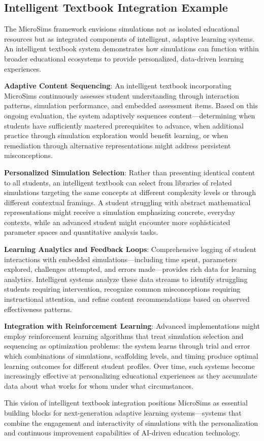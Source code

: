 \subsection{Intelligent Textbook Integration Example}

The MicroSims framework envisions simulations not as isolated educational resources but as integrated components of intelligent, adaptive learning systems. An intelligent textbook system demonstrates how simulations can function within broader educational ecosystems to provide personalized, data-driven learning experiences.

\textbf{Adaptive Content Sequencing}: An intelligent textbook incorporating MicroSims continuously assesses student understanding through interaction patterns, simulation performance, and embedded assessment items. Based on this ongoing evaluation, the system adaptively sequences content—determining when students have sufficiently mastered prerequisites to advance, when additional practice through simulation exploration would benefit learning, or when remediation through alternative representations might address persistent misconceptions.

\textbf{Personalized Simulation Selection}: Rather than presenting identical content to all students, an intelligent textbook can select from libraries of related simulations targeting the same concepts at different complexity levels or through different contextual framings. A student struggling with abstract mathematical representations might receive a simulation emphasizing concrete, everyday contexts, while an advanced student might encounter more sophisticated parameter spaces and quantitative analysis tasks.

\textbf{Learning Analytics and Feedback Loops}: Comprehensive logging of student interactions with embedded simulations—including time spent, parameters explored, challenges attempted, and errors made—provides rich data for learning analytics. Intelligent systems analyze these data streams to identify struggling students requiring intervention, recognize common misconceptions requiring instructional attention, and refine content recommendations based on observed effectiveness patterns.

\textbf{Integration with Reinforcement Learning}: Advanced implementations might employ reinforcement learning algorithms that treat simulation selection and sequencing as optimization problems: the system learns through trial and error which combinations of simulations, scaffolding levels, and timing produce optimal learning outcomes for different student profiles. Over time, such systems become increasingly effective at personalizing educational experiences as they accumulate data about what works for whom under what circumstances.

This vision of intelligent textbook integration positions MicroSims as essential building blocks for next-generation adaptive learning systems—systems that combine the engagement and interactivity of simulations with the personalization and continuous improvement capabilities of AI-driven education technology.
